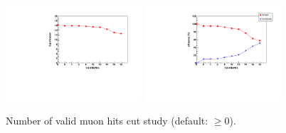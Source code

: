 \begin{figure}[h!]
 \begin{center}
   \includegraphics[angle=0,width=0.45\textwidth]{chap_YInPbPbColl2011_figures/ValidMuHits_Significance1}
   \includegraphics[angle=0,width=0.45\textwidth]{chap_YInPbPbColl2011_figures/ValidMuHits_SigBkgRejEff}
   \caption{Number of valid muon hits cut study  (default: $\geq 0$).} %
   \label{fig:muun_valid_hits}
 \end{center}
\end{figure}

